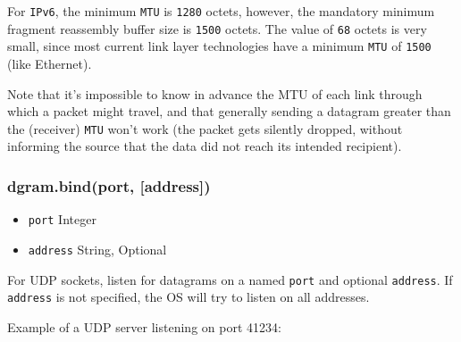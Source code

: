 For \texttt{IPv6}, the minimum \texttt{MTU} is \texttt{1280} octets,
however, the mandatory minimum fragment reassembly buffer size is
\texttt{1500} octets. The value of \texttt{68} octets is very small,
since most current link layer technologies have a minimum \texttt{MTU}
of \texttt{1500} (like Ethernet).

Note that it's impossible to know in advance the MTU of each link
through which a packet might travel, and that generally sending a
datagram greater than the (receiver) \texttt{MTU} won't work (the packet
gets silently dropped, without informing the source that the data did
not reach its intended recipient).

\subsubsection{dgram.bind(port, {[}address{]})}

\begin{itemize}
\item
  \texttt{port} Integer
\item
  \texttt{address} String, Optional
\end{itemize}

For UDP sockets, listen for datagrams on a named \texttt{port} and
optional \texttt{address}. If \texttt{address} is not specified, the OS
will try to listen on all addresses.

Example of a UDP server listening on port 41234:

\begin{Shaded}
\begin{Highlighting}[]
 \NormalTok{);}

 \NormalTok{(}\NormalTok{);}

\NormalTok{(}\NormalTok{, } 
  \NormalTok{(}  \NormalTok{+}
     \NormalTok{+ } \NormalTok{+ }\NormalTok{);}
\NormalTok{\});}

\NormalTok{(}\NormalTok{, } \NormalTok{() \{}
   \NormalTok{();}
  \NormalTok{(} \NormalTok{+}
       \NormalTok{+ } \NormalTok{+ }\NormalTok{);}
\NormalTok{\});}

\NormalTok{(}\NormalTok{);}
\end{Highlighting}
\end{Shaded}

